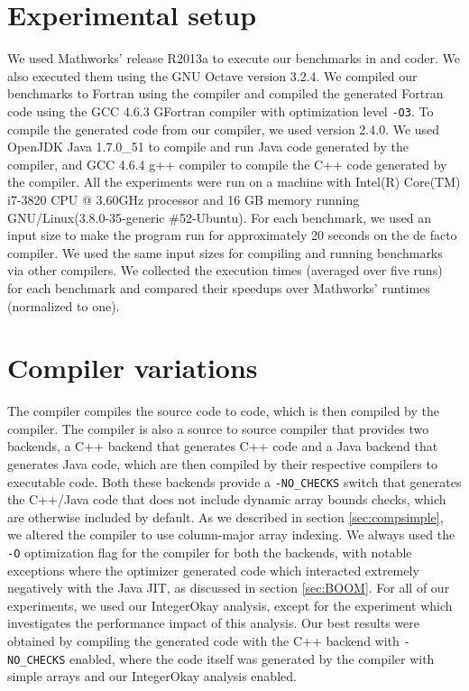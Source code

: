 \section{Experimental setup}

We used Mathworks' \matlab release R2013a to execute our benchmarks in \matlab
and \matlab coder. We also executed them using the GNU Octave version 3.2.4. We
compiled our benchmarks to Fortran using the \mctwofor compiler and compiled
the generated Fortran code using the GCC 4.6.3 GFortran compiler with
optimization level \texttt{-O3}. To compile the generated \xten code from our
\mixten compiler, we used \xten version 2.4.0. We used OpenJDK Java 1.7.0\_51
to compile and run Java code generated by the \xten compiler, and GCC 4.6.4 g++
compiler to compile the C++ code generated by the \xten compiler. All the
experiments were run on a machine with Intel(R) Core(TM) i7-3820 CPU @ 3.60GHz
processor and 16 GB memory running GNU/Linux(3.8.0-35-generic \#52-Ubuntu). For
each benchmark, we used an input size to make the program run for approximately
20 seconds on the de facto \matlab compiler. We used the same input sizes for
compiling and running benchmarks via other compilers. We collected the
execution times (averaged over five runs) for each benchmark and compared their
speedups over Mathworks' \matlab runtimes (normalized to one). 

\section{\xten Compiler variations}

The \mixten compiler compiles the source \matlab code to \xten code, which is
then compiled by the \xten compiler. The \xten compiler is also a source to 
source compiler that provides two
backends, a C++ backend that generates C++ code and a Java backend that
generates Java code, which are then compiled by their respective compilers to
executable code.  Both these backends provide a \texttt{-NO\_CHECKS}
switch that generates the C++/Java code that does not include dynamic
array bounds checks, which are otherwise included by default.  As we
described in section \ref{sec:compsimple}, we altered the \xten compiler to use
column-major array indexing.  We always used the \texttt{-O}
optimization flag for the \xten compiler for both the backends, with
notable exceptions where the \xten optimizer generated code which
interacted extremely negatively with the Java JIT, as discussed in
section \ref{sec:BOOM}.  For all of our experiments, we used our IntegerOkay
analysis, except for the experiment which investigates the performance
impact of this analysis. Our best results were obtained by compiling the
generated \xten code with the C++ backend with \texttt{-NO\_CHECKS}
enabled, where the \xten code itself was generated by the \mixten
compiler with simple arrays and our IntegerOkay analysis enabled. 


